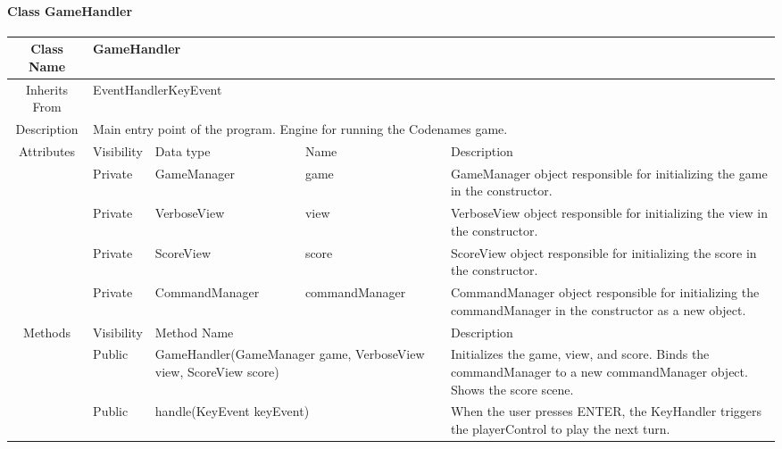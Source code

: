 \paragraph{Class GameHandler}\mbox{}
\begin{tabularx}{\textwidth}{|c||l|X|X|X|}
    \hline
    \cellcolor{lightgray}Class Name & \multicolumn{4}{X|}{GameHandler}\\
    \hline
    \cellcolor{lightgray}Inherits From & \multicolumn{4}{X|}{EventHandler\textlangle{}KeyEvent\textrangle{}}\\
    \hline
    \cellcolor{lightgray}Description & \multicolumn{4}{p{12cm}|}{Main entry point of the program. Engine for running the Codenames game.}\\
    \hline\hline
    
    \cellcolor{lightgray}Attributes & \cellcolor{lightgray}Visibility & \cellcolor{lightgray}Data type & \cellcolor{lightgray}Name & \cellcolor{lightgray}Description\\\cline{2-5}
    \cellcolor{lightgray} & Private & GameManager & game & GameManager object responsible for initializing the game in the constructor.\\\cline{2-5}
    \cellcolor{lightgray} & Private & VerboseView & view & VerboseView object  responsible for initializing the view in the constructor.\\\cline{2-5}
    \cellcolor{lightgray} & Private & ScoreView & score & ScoreView object  responsible for initializing the score in the constructor.\\\cline{2-5}
    \cellcolor{lightgray} & Private & CommandManager & commandManager & CommandManager object  responsible for initializing the commandManager in the constructor as a new object.\\
    \hline\hline
    
    \cellcolor{lightgray}Methods & \cellcolor{lightgray}Visibility & \multicolumn{2}{l|}{\cellcolor{lightgray}Method Name} & \cellcolor{lightgray}Description\\\cline{2-5}
    \cellcolor{lightgray} & Public & \multicolumn{2}{X|}{GameHandler(GameManager game, VerboseView view, ScoreView score)} & Initializes the game, view, and score. Binds the commandManager to a new commandManager object. Shows the score scene.\\\cline{2-5}
    \cellcolor{lightgray} & Public & \multicolumn{2}{X|}{handle(KeyEvent keyEvent)} & When the user presses ENTER, the KeyHandler triggers the playerControl to play the next turn.\\
    \hline
\end{tabularx}

